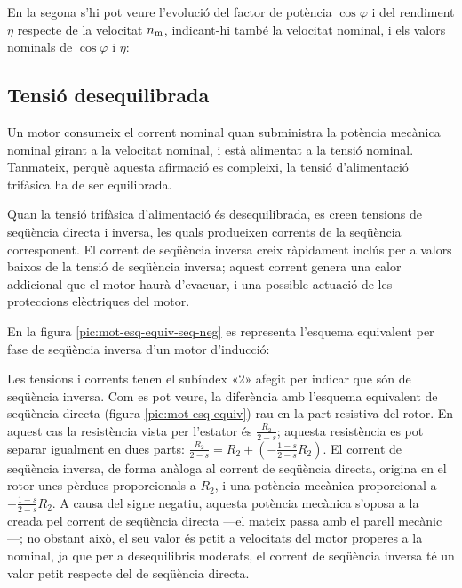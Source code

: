 \begin{exemple}
	En la segona s'hi pot veure l'evolució del factor de potència $\cos\varphi$ i del rendiment $\eta$ respecte de la velocitat $n_\mathrm{m}$, indicant-hi també la  velocitat nominal, i els valors nominals de $\cos\varphi$ i $\eta$:
	\vspace{-3mm}
	\begin{center}
	\fontsize{10pt}{11pt}\selectfont
	
	\end{center}	

\end{exemple}

\subsection{Tensió desequilibrada}\label{sec:mot-tens-deseq}

Un motor consumeix el corrent nominal quan subministra la potència mecànica nominal girant a la velocitat nominal, i està alimentat a la tensió nominal. Tanmateix, perquè aquesta afirmació es compleixi, la tensió d'alimentació trifàsica ha de ser equilibrada.

Quan la tensió trifàsica d'alimentació és desequilibrada, es creen tensions de seqüència directa i inversa, les quals  produeixen corrents de la seqüència corresponent. El corrent de seqüència inversa creix ràpidament inclús per a valors baixos de  la tensió de seqüència inversa; aquest corrent genera una calor addicional que el motor haurà d'evacuar, i una possible actuació de les proteccions elèctriques del motor.

En la figura \vref{pic:mot-esq-equiv-seq-neg} es representa l'esquema equivalent per fase de seqüència inversa d'un   motor d'inducció:
\vspace{-2mm}
\begin{center}
	
	\label{pic:mot-esq-equiv-seq-neg}
\end{center}

Les tensions i corrents tenen el subíndex «2» afegit per indicar que són de seqüència inversa. Com es pot veure, la diferència amb l'esquema equivalent de seqüència directa (figura \vref{pic:mot-esq-equiv}) rau en la part resistiva del rotor. En aquest cas la resistència vista per l'estator és $\frac{R_2}{2-s}$; aquesta resistència es pot separar igualment en dues parts: $\frac{R_2}{2-s} = R_2 + \left(-\frac{1-s}{2-s} R_2\right)$. El corrent de seqüència inversa, de forma anàloga al corrent de seqüència directa,  origina en el rotor unes pèrdues proporcionals a  $R_2$, i una potència mecànica proporcional a $- \frac{1-s}{2-s} R_2$. A causa del signe negatiu, aquesta potència mecànica  s'oposa a la  creada pel corrent de seqüència directa ---el mateix passa amb el parell mecànic---; no obstant això, el seu valor és petit a velocitats del motor properes a la nominal, ja que per a desequilibris moderats, el corrent de seqüència inversa té un valor petit respecte del de seqüència directa.

